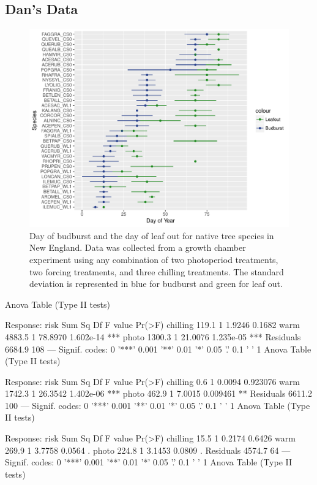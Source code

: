 \documentclass{article}\usepackage[]{graphicx}\usepackage[]{color}
\begin{document}
\subsection*{Dan's Data}
\begin{figure} [H]
\begin{center}
\caption{Day of budburst and the day of leaf out for native tree species in New England. Data was collected from a growth chamber experiment using any combination of two photoperiod treatments, two forcing treatments, and three chilling treatments. The standard deviation is represented in blue for budburst and green for leaf out. }
\includegraphics{..//output/Dan_TXandSp.pdf} 
\end{center}
\end{figure}


Anova Table (Type II tests)

Response: risk
          Sum Sq  Df F value    Pr(>F)    
chilling   119.1   1  1.9246    0.1682    
warm      4883.5   1 78.8970 1.602e-14 ***
photo     1300.3   1 21.0076 1.235e-05 ***
Residuals 6684.9 108                      
---
Signif. codes:  0 '***' 0.001 '**' 0.01 '*' 0.05 '.' 0.1 ' ' 1
Anova Table (Type II tests)

Response: risk
          Sum Sq  Df F value    Pr(>F)    
chilling     0.6   1  0.0094  0.923076    
warm      1742.3   1 26.3542 1.402e-06 ***
photo      462.9   1  7.0015  0.009461 ** 
Residuals 6611.2 100                      
---
Signif. codes:  0 '***' 0.001 '**' 0.01 '*' 0.05 '.' 0.1 ' ' 1
Anova Table (Type II tests)

Response: risk
          Sum Sq Df F value Pr(>F)  
chilling    15.5  1  0.2174 0.6426  
warm       269.9  1  3.7758 0.0564 .
photo      224.8  1  3.1453 0.0809 .
Residuals 4574.7 64                 
---
Signif. codes:  0 '***' 0.001 '**' 0.01 '*' 0.05 '.' 0.1 ' ' 1
Anova Table (Type II tests)
\end{document}
